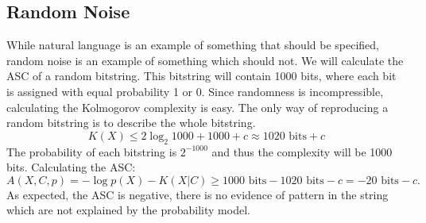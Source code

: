\subsection{Random Noise}
While natural language is an example of something that should be specified, random noise is an example of something which should not.
We will calculate the ASC of a random bitstring.
This bitstring will contain 1000 bits, where each bit is assigned with equal probability 1 or 0.
Since randomness is incompressible, calculating the Kolmogorov complexity is easy.
The only way of reproducing a random bitstring is to describe the whole bitstring.
\begin{equation}
    K(X) \leq 2 \log_2 1000 + 1000 + c \approx 1020 \mbox{ bits} + c
\end{equation}
The probability of each bitstring is $2^{-1000}$ and thus the complexity will be 1000 bits.
Calculating the ASC:
\begin{equation}
    A(X,C,p) = - \log p(X) - K(X|C) \geq 1000 \mbox{ bits} - 1020 \mbox{ bits} - c = -20 \mbox{ bits} - c \mbox{.}
\end{equation}
As expected, the ASC is negative, there is no evidence of pattern in the string which are not explained by the probability model.

